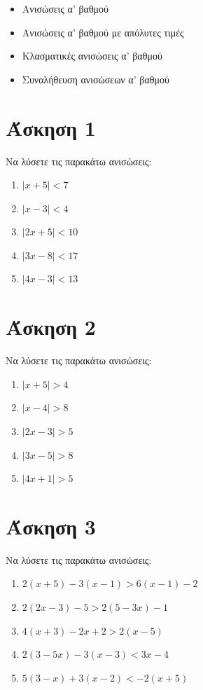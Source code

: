 \documentclass[a4paper,10pt]{report}
\begin{document}
\vspace{2em}
\begin{itemize}
\item Ανισώσεις α' βαθμού
\item Ανισώσεις α' βαθμού με απόλυτες τιμές
\item Κλασματικές ανισώσεις α' βαθμού
\item Συναλήθευση ανισώσεων α' βαθμού
\end{itemize}

\section*{Άσκηση 1  \hfill \small{}}
Να λύσετε τις παρακάτω ανισώσεις:
\begin{enumerate}[1)]
 \item $|x+5| < 7$
 \item $|x-3| < 4$
 \item $|2x+5|< 10$
 \item $|3x-8|< 17$
 \item $|4x-3|< 13$
\end{enumerate}


\section*{Άσκηση 2  \hfill \small{}}
Να λύσετε τις παρακάτω ανισώσεις:
\begin{enumerate}[1)]
 \item $|x+5| > 4$
 \item $|x-4| > 8$
 \item $|2x-3|> 5$
 \item $|3x-5|> 8 $
 \item $|4x+1|> 5$
\end{enumerate}


\section*{Άσκηση 3  \hfill \small{}}
Να λύσετε τις παρακάτω ανισώσεις:
\begin{enumerate}[1)]
 \item $2(x+5)-3(x-1)>6(x-1)-2$
 \item $2(2x-3)-5>2(5-3x)-1$
 \item $4(x+3)-2x+2>2(x-5)$
 \item $2(3-5x)-3(x-3)<3x-4$
 \item $5(3-x)+3(x-2)<-2(x+5)$
\end{enumerate}
 
\end{document}
